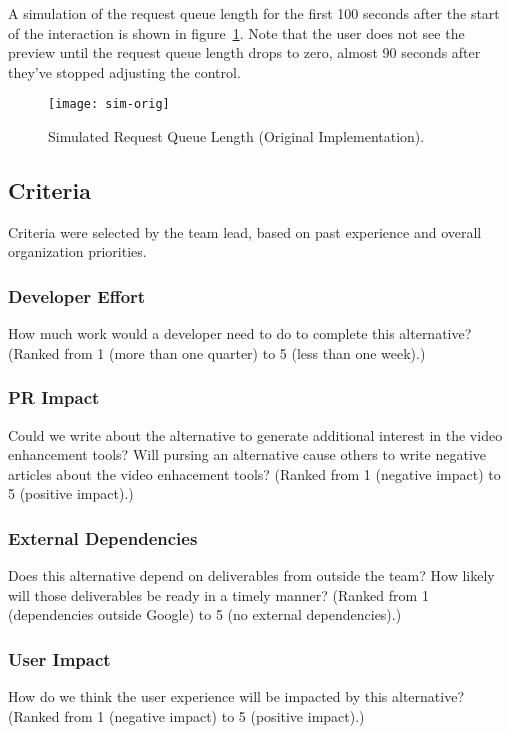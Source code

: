 \documentclass[se]{uw-wkrpt}
\begin{document}
A simulation of the request queue length for the first 100 seconds after
the start of the interaction is shown in figure~\ref{fig:sim-orig}. Note
that the user does not see the preview until the request queue length drops
to zero, almost 90 seconds after they've stopped adjusting the control.

\begin{figure}
  \centering
  \texttt{[image: sim-orig]}
  \caption{Simulated Request Queue Length (Original Implementation).}
  \label{fig:sim-orig}
\end{figure}

\subsection {Criteria}
Criteria were selected by the team lead, based on past experience and
overall organization priorities.

\subsubsection{Developer Effort}
How much work would a developer need to do to complete this alternative?
(Ranked from 1 (more than one quarter) to 5 (less than one week).)

\subsubsection{PR Impact}
Could we write about the alternative to generate additional interest in the
video enhancement tools? Will pursing an alternative cause others to write
negative articles about the video enhacement tools? (Ranked from 1
(negative impact) to 5 (positive impact).)

\subsubsection{External Dependencies}
Does this alternative depend on deliverables from outside the team? How
likely will those deliverables be ready in a timely manner? (Ranked from
1 (dependencies outside Google) to 5 (no external dependencies).)

\subsubsection{User Impact}
How do we think the user experience will be impacted by this alternative?
(Ranked from 1 (negative impact) to 5 (positive impact).)
\end{document}
